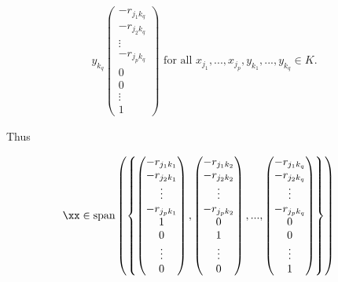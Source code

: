 \begin{deriv}
\begin{align*}
        y_{k_q}
        \begin{pmatrix}
            -r_{j_1 k_q} \\
            -r_{j_2 k_q} \\
            \vdots \\
            -r_{j_p k_q} \\
            0 \\
            0 \\
            \vdots \\
            1
        \end{pmatrix}
        \text{ for all $x_{j_1}, ..., x_{j_p}, y_{k_1}, ..., y_{k_q} \in K$}.
    \end{align*}

    Thus

    \begin{align*}
        \xx &\in
        \spann
        \left(\left\{
            \begin{pmatrix}
                -r_{j_1 k_1} \\
                -r_{j_2 k_1} \\
                \vdots \\
                -r_{j_p k_1} \\
                1 \\
                0 \\
                \vdots \\
                0
            \end{pmatrix}
            ,
            \begin{pmatrix}
                -r_{j_1 k_2} \\
                -r_{j_2 k_2} \\
                \vdots \\
                -r_{j_p k_2} \\
                0 \\
                1 \\
                \vdots \\
                0
            \end{pmatrix}
            , ...,
            \begin{pmatrix}
                -r_{j_1 k_q} \\
                -r_{j_2 k_q} \\
                \vdots \\
                -r_{j_p k_q} \\
                0 \\
                0 \\
                \vdots \\
                1
            \end{pmatrix}
        \right\}\right)
    \end{align*}


\end{deriv}
